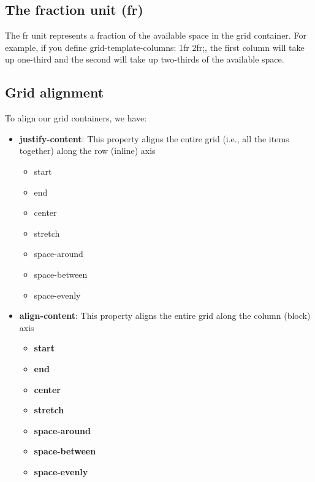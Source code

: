 \documentclass{report}
\begin{document}
    \bigbreak \noindent 
    \subsection{The fraction unit (fr)}
    \bigbreak \noindent 
    The fr unit represents a fraction of the available space in the grid container. For example, if you define grid-template-columns: 1fr 2fr;, the first column will take up one-third and the second will take up two-thirds of the available space.

    \pagebreak \bigbreak \noindent 
    \subsection{Grid alignment}
    \bigbreak \noindent 
    To align our grid containers, we have:
    \begin{itemize}
        \item \textbf{justify-content}: This property aligns the entire grid (i.e., all the items together) along the row (inline) axis 
            \begin{itemize}
                \item start
                \item end
                \item center
                \item stretch
                \item space-around
                \item space-between
                \item space-evenly
            \end{itemize}
        \item \textbf{align-content}: This property aligns the entire grid along the column (block) axis 
            \begin{itemize}
                \item \textbf{start}
                \item \textbf{end}
                \item \textbf{center}
                \item \textbf{stretch}
                \item \textbf{space-around}
                \item \textbf{space-between}
                \item \textbf{space-evenly}
            \end{itemize}
    \end{itemize}
\end{document}
